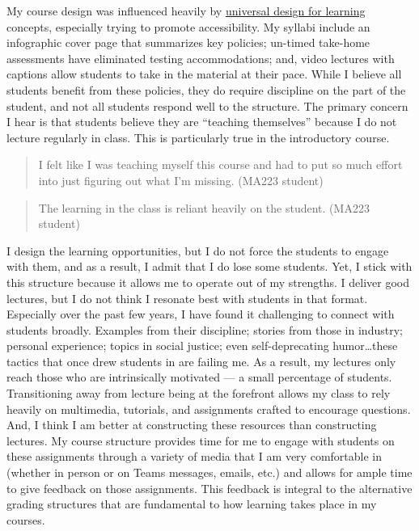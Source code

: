 \documentclass[
  letterpaper,
  DIV=11,
  numbers=noendperiod]{scrreprt}
\begin{document}
My course design was influenced heavily by
\href{https://udlguidelines.cast.org/}{universal design for learning}
concepts, especially trying to promote accessibility. My syllabi include
an infographic cover page that summarizes key policies; un-timed
take-home assessments have eliminated testing accommodations; and, video
lectures with captions allow students to take in the material at their
pace. While I believe all students benefit from these policies, they do
require discipline on the part of the student, and not all students
respond well to the structure. The primary concern I hear is that
students believe they are ``teaching themselves'' because I do not
lecture regularly in class. This is particularly true in the
introductory course.

\begin{quote}
I felt like I was teaching myself this course and had to put so much
effort into just figuring out what I'm missing. (MA223 student)
\end{quote}

\begin{quote}
The learning in the class is reliant heavily on the student. (MA223
student)
\end{quote}

I design the learning opportunities, but I do not force the students to
engage with them, and as a result, I admit that I do lose some students.
Yet, I stick with this structure because it allows me to operate out of
my strengths. I deliver good lectures, but I do not think I resonate
best with students in that format. Especially over the past few years, I
have found it challenging to connect with students broadly. Examples
from their discipline; stories from those in industry; personal
experience; topics in social justice; even self-deprecating
humor\ldots these tactics that once drew students in are failing me. As
a result, my lectures only reach those who are intrinsically motivated
--- a small percentage of students. Transitioning away from lecture
being at the forefront allows my class to rely heavily on multimedia,
tutorials, and assignments crafted to encourage questions. And, I think
I am better at constructing these resources than constructing lectures.
My course structure provides time for me to engage with students on
these assignments through a variety of media that I am very comfortable
in (whether in person or on Teams messages, emails, etc.) and allows for
ample time to give feedback on those assignments. This feedback is
integral to the alternative grading structures that are fundamental to
how learning takes place in my courses.
\end{document}
